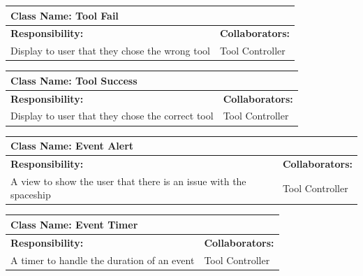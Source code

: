\documentclass[12pt, titlepage]{article}
\begin{document}
\begin{enumerate}[a)]
	\begin{table}[H]
		\centering
		\begin{tabular}{|p{5cm}|p{5cm}|}
		\hline 
		 \multicolumn{2}{|l|}{\textbf{Class Name: Tool Fail}} \\
		\hline
		\textbf{Responsibility:} & \textbf{Collaborators:} \\
		\hline
		 Display to user that they chose the wrong tool & Tool Controller\\
		\hline
		\end{tabular}
	\end{table}

	\begin{table}[H]
		\centering
		\begin{tabular}{|p{5cm}|p{5cm}|}
		\hline 
		 \multicolumn{2}{|l|}{\textbf{Class Name: Tool Success}} \\
		\hline
		\textbf{Responsibility:} & \textbf{Collaborators:} \\
		\hline
		 Display to user that they chose the correct tool & Tool Controller\\
		\hline
		\end{tabular}
	\end{table}

	\begin{table}[H]
		\centering
		\begin{tabular}{|p{5cm}|p{5cm}|}
		\hline 
		 \multicolumn{2}{|l|}{\textbf{Class Name: Event Alert}} \\
		\hline
		\textbf{Responsibility:} & \textbf{Collaborators:} \\
		\hline
		 A view to show the user that there is an issue with the spaceship & Tool Controller\\
		\hline
		\end{tabular}
	\end{table}

	\begin{table}[H]
		\centering
		\begin{tabular}{|p{5cm}|p{5cm}|}
		\hline 
		 \multicolumn{2}{|l|}{\textbf{Class Name: Event Timer}} \\
		\hline
		\textbf{Responsibility:} & \textbf{Collaborators:} \\
		\hline
		 A timer to handle the duration of an event & Tool Controller\\
		\hline
		\end{tabular}
	\end{table}


\end{enumerate}
\end{document}
